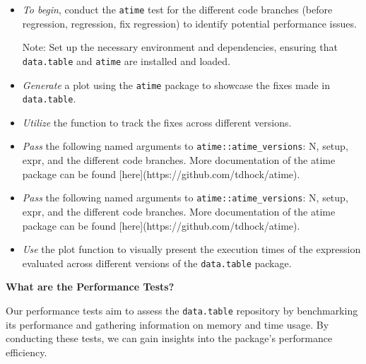 \begin{itemize}
    

\item \textit{To begin}, conduct the \texttt{atime} test for the different code branches (before regression, regression, fix regression) to identify potential performance issues. 
\vspace{0.1in}

\noindent Note: Set up the necessary environment and dependencies, ensuring that \texttt{data.table} and \texttt{atime} are installed and loaded.
\vspace{0.1in}

\item \textit{Generate} a plot using the \texttt{atime} package to showcase the fixes made in \texttt{data.table}.

\vspace{0.1in}
\item \textit{Utilize} the  function to track the fixes across different versions.
\vspace{0.1in}


\item \textit{Pass} the following named arguments to \texttt{atime::atime\_versions}: N, setup, expr, and the different code branches. More documentation of the atime package can be found [here](https://github.com/tdhock/atime). 

\item \textit{Pass} the following named arguments to \texttt{atime::atime\_versions}: N, setup, expr, and the different code branches. More documentation of the atime package can be found [here](https://github.com/tdhock/atime).  

\vspace{0.1in}

\item \textit{Use} the plot function to visually present the execution times of the expression evaluated across different versions of the \texttt{data.table} package.

\end{itemize}

\textbf{What are the Performance Tests?}

Our  performance tests aim to assess the \texttt{data.table} repository by benchmarking its performance and gathering information on memory and time usage. By conducting these tests, we can gain insights into the package’s performance efficiency.

